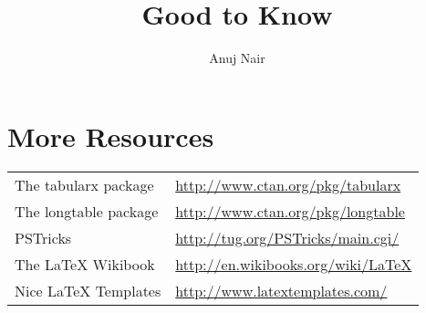 \documentclass{article}
\title{Good to Know}
\author{Anuj Nair}
\date{}
\begin{document}
\maketitle

\section{More Resources}

\begin{tabular}{l l}
	The tabularx package & \url{http://www.ctan.org/pkg/tabularx} \\
	The longtable package & \url{http://www.ctan.org/pkg/longtable} \\ 
	PSTricks & \url{http://tug.org/PSTricks/main.cgi/} \\
	The {\LaTeX} Wikibook & \url{http://en.wikibooks.org/wiki/LaTeX} \\ 
	Nice {\LaTeX} Templates & \url{http://www.latextemplates.com/} \\
\end{tabular}
\end{document}
